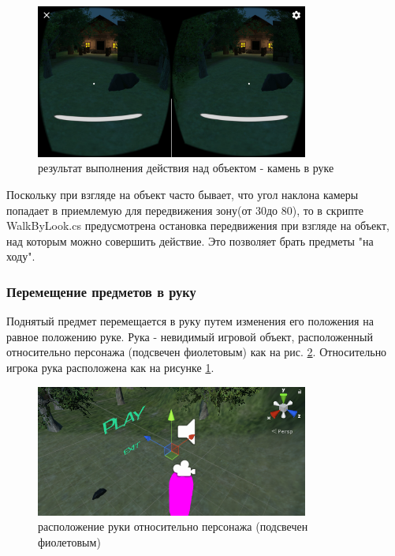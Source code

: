 \begin{figure}[h!]
	\centering
	\includegraphics[width=0.8\textwidth]{./screenshots/picked_stone1.jpg}
	\caption{\small{результат выполнения действия над объектом - камень в руке}}
	\label{picked_stone}
\end{figure} 

\tab[0.75cm]Поскольку при взгляде на объект часто бывает, что угол наклона камеры попадает в приемлемую для передвижения зону(от 30\degr до 80\degr), то в скрипте WalkByLook.cs предусмотрена остановка передвижения при взгляде на объект, над которым можно совершить действие. Это позволяет брать предметы "на ходу". 

\subsubsection{Перемещение предметов в руку}

\tab[0.75cm]Поднятый предмет перемещается в руку путем изменения его положения на равное положению руке. Рука - невидимый игровой объект, расположенный относительно персонажа (подсвечен фиолетовым) как на рис. \ref{hand}. Относительно игрока рука расположена как на рисунке \ref{picked_stone}.

\begin{figure}[h!]
	\centering
	\includegraphics[width=0.8\textwidth]{./screenshots/hand.png}
	\caption{\small{расположение руки относительно персонажа (подсвечен фиолетовым)}}
	\label{hand}
\end{figure} 

